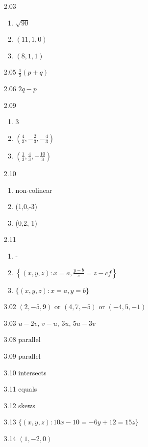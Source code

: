 \documentclass{article}
\begin{document}
\begin{enumerate}
  \item[2.03]
    \begin{enumerate}[\hspace{0.5cm}(a)]
      \item $\sqrt{90}$
      \item $(11,1,0)$
      \item $(8,1,1)$
    \end{enumerate}
  \item[2.05] ${\frac{1}{2}(p+q)}$
  \item[2.06] $2q-p$
  \item[2.09]
    \begin{enumerate}[\hspace{0.5cm}(a)]
      \item $3$
      \item $\left( \frac{4}{3}, -\frac{2}{3}, -\frac{4}{3} \right)$
      \item $\left( \frac{1}{3}, \frac{4}{3}, -\frac{10}{3} \right)$
    \end{enumerate}
  \item[2.10]
    \begin{enumerate}[\hspace{0.5cm}(a)]
      \item non-colinear
      \item (1,0,-3)
      \item (0,2,-1)
    \end{enumerate}
  \item[2.11]
    \begin{enumerate}[\hspace{0.5cm}(a)]
      \item -
      \item $\left\{ (x,y,z): x=a, \frac{y-b}{e} = {z-c}{f} \right\}$
      \item $\{ (x,y,z): x=a, y=b \}$
    \end{enumerate}
\end{enumerate}
\vspace{0.5cm}

\begin{enumerate}
  \item[3.02] $(2, -5, 9)$ or $(4, 7, -5)$ or $(-4, 5, -1)$
  \item[3.03] $u-2v$, $v-u$, $3u$, $5u-3v$
  \item[3.08] parallel
  \item[3.09] parallel
  \item[3.10] intersects
  \item[3.11] equals
  \item[3.12] skews
  \item[3.13] $\{ (x,y,z): 10x-10 = -6y+12 = 15z \}$
  \item[3.14] $(1, -2, 0)$
\end{enumerate}
\vspace{0.5cm}
\end{document}
